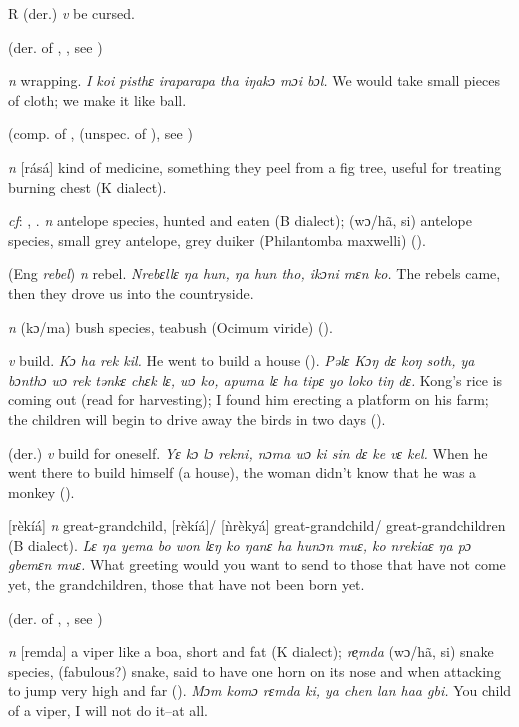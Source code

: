 \begin{letter}{R}
 (der.) \textit{v} be cursed.

 (der. of , , see ) 

 \textit{n} wrapping. \textit{I koi pisthɛ iraparapa tha iŋakɔ mɔi bɔl.} We would take small pieces of cloth; we make it like ball.

 (comp. of ,  (unspec. of ), see ) 

 \textit{n} [rásá] kind of medicine, something they peel from a fig tree, useful for treating burning chest (K dialect). 

 \textit{cf}: , . \textit{n} antelope species, hunted and eaten (B dialect); (wɔ/hã, si) antelope species, small grey antelope, grey duiker (Philantomba maxwelli) (\citealt{Pichl1967}). 

 (Eng \textit{rebel}) \textit{n} rebel. \textit{Nrebɛllɛ ŋa hun, ŋa hun tho, ikɔni mɛn ko.} The rebels came, then they drove us into the countryside.

 \textit{n} (kɔ/ma) bush species, teabush (Ocimum viride) (\citealt{Pichl1967}). 

 \textit{v} build. \textit{Kɔ ha rek kil.} He went to build a house (\citealt{Pichl1967}). \textit{Pəlɛ Kɔŋ dɛ koŋ soth, ya bɔnthɔ wɔ rek tənkɛ chɛk lɛ, wɔ ko, apuma lɛ ha tipɛ yo loko tiŋ dɛ.} Kong's rice is coming out (read for harvesting); I found him erecting a platform on his farm; the children will begin to drive away the birds in two days (\citealt{Pichl1967}). 

 (der.) \textit{v} build for oneself. \textit{Yɛ kɔ lɔ rekni, nɔma wɔ ki sin dɛ ke vɛ kel.} When he went there to build himself (a house), the woman didn't know that he was a monkey (\citealt{Pichl1967}). 

 [rèkíá] \textit{n} great-grandchild, [rèkíá]/ [ǹrèkyá] great-grandchild/ great-grandchildren (B dialect). \textit{Lɛ ŋa yema bo won lɛŋ ko ŋanɛ ha hunɔn muɛ, ko nrekiaɛ ŋa pɔ gbemɛn muɛ.} What greeting would you want to send to those that have not come yet, the grandchildren, those that have not been born yet.

 (der. of , , see ) 

 \textit{n} [remda] a viper like a boa, short and fat (K dialect); \textit{re̹mda} (wɔ/hã, si) snake species, (fabulous?) snake, said to have one horn on its nose and when attacking to jump very high and far (\citealt{Pichl1967}). \textit{Mɔm komɔ rɛmda ki, ya chen lan haa gbi.} You child of a viper, I will not do it--at all. 


\end{letter}

